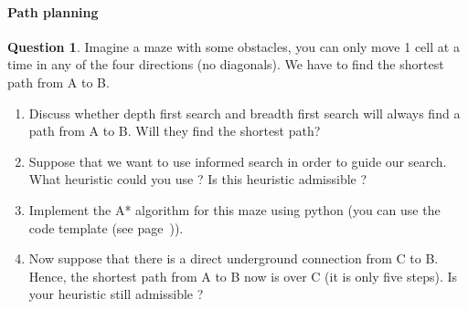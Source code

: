 \documentclass[11pt,a4paper]{article}
\theoremstyle{definition}%
\newtheorem{Q}{Question}[] %
\begin{document}
\paragraph{Path planning}
\begin{Q}
    Imagine a maze with some obstacles, you can only move 1 cell at a time in any of 
    the four directions (no diagonals). We have to find the shortest path from A to B.
\begin{enumerate}
    \item Discuss whether depth first search and breadth first search will always find a path from
    A to B. Will they find the shortest path?
    \item Suppose that we want to use informed search in order to guide our search. 
        What heuristic could you use ? Is this heuristic admissible ?
    \item Implement the A* algorithm for this maze using python (you can use the code template (see page~\pageref{source})).
    \item Now suppose that there is a direct underground connection from C to B. Hence, the
    shortest path from A to B now is over C (it is only five steps). Is your heuristic still admissible ?
\end{enumerate}



\end{Q}
\end{document}
